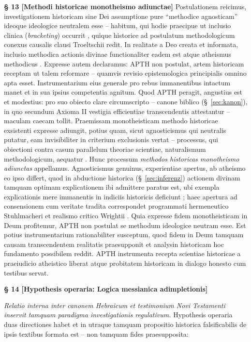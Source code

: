 \documentclass[11pt,a4paper]{article}
\makeatletter
\newcommand{\apth}{{\apthfont APTH}\hspace{0.15em}\xspace}
\newcommand{\apthsec}[3]{%
  \phantomsection%
  \def\@currentlabel{#1}%
  \label{sec:#3}%
  \textbf{§ #1 [#2]}%
}
\makeatother
\begin{document}
\apthsec{13}{Methodi historicae monotheismo adiunctae}{adjungierung} Postulationem reicimus, investigationem historicam sine Dei assumptione pure ``methodice agnosticam'' ideoque ideologice neutralem esse -- habitum, qui hodie praecipue ut inclusio clinica (\textit{bracketing}) occurrit \citep{meier1991}, quique historice ad postulatum methodologicum conexus causalis clausi Troeltschii \citeyearpar{troeltsch1913} redit. In realitate a Deo creata et informata, inclusio methodica actionis divinae functionaliter eadem est atque atheismus methodicus \citep{schlatter1905,pannenberg1961,maier1974,linnemann1999}. Expresse autem declaramus: \apth non postulat, artem historicam receptam ut talem reformare -- quamvis revisio epistemologica principialis omnino apta esset. Instrumentarium eius generale pro rebus immanentibus intactum manet et in sua ipsius competentia agnitum. Quod \apth peragit, angustius est et modestius: pro suo obiecto clare circumscripto -- canone biblico (§~\ref{sec:kanon}), in quo secundum Axioma II vestigia efficientiae transcendentis attestantur -- maculam caecam tollit. Praemissam monotheisticam methodo historicae exsistenti expresse adiungit, potius quam, sicut agnosticismus qui neutralis putatur, eam invisibiliter in criterium exclusionis vertat -- processus, qui obiectioni contra casum parallelum theoriae scientiae, naturalismum methodologicum, aequatur \citep{plantinga2011}. Hunc processum \textit{methodos historicas monotheismo adiunctas} appellamus. Agnosticismus genuinus, experientiae apertus, ab atheismo eo ipso differt, quod in abductione historica (§~\ref{sec:inferenz}) actionem divinam tamquam optimam explicationem ibi admittere paratus est, ubi exempla explicationis mere immanentis in indiciis historicis deficiunt \citep{keener2011,licona2010,wright2003}; haec apertura ad consensionem cum veritate tradita correspondet programmati hermeneutico Stuhlmacheri \citep{stuhlmacher1979,stuhlmacher1989} et realismo critico Wrightii \citep{wright1992}. Quia expresse fidem monotheisticam in Deum profitemur, \apth non postulat se methodum ideologice neutram esse. Est potius instrumentarium rationabiliter susceptum, quod fidem in Deum tamquam causam transcendentem realitatis praesupponit et analysin historicam hoc fundamento possibilem reddit. \apth instrumenta recepta scientiae historicae a praeiudicio atheistico liberat atque probitatem historicam in dialogo honesto cum testibus servat.

\apthsec{14}{Hypothesis operaria: Logica messianica adimpletionis}{erfuellungslogik}
\textit{Relatio interna inter canonem Hebraicum et testimonium Novi Testamenti inservit tamquam paradigma investigationis regulativum.}
Hypothesis operaria duas directiones habet et in utraque tamquam propositio historica falsificabilis de ipsis textibus formata est -- non tamquam fides praesupposita:
\end{document}
